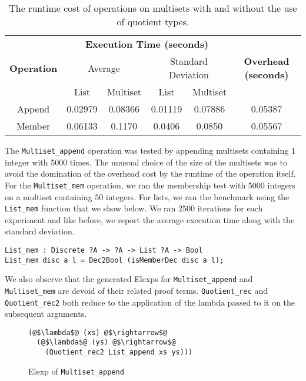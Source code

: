 \documentclass[12pt,twoside,maitrise]{dms}
\theoremstyle{definition}
\numberwithin{equation}{section}
\numberwithin{table}{chapter}
\numberwithin{figure}{chapter}
\newcommand\id[1] {\texttt{#1}}
\begin{document}
\begin{table}[]
\centering
\begin{tabular}{@{}cccccc@{}}
\toprule
\multirow{3}{*}{\textbf{Operation}} & \multicolumn{4}{c}{\textbf{Execution Time (seconds)}} & \multirow{3}{*}{\textbf{Overhead (seconds)}} \\ \cmidrule(lr){2-5}
       & \multicolumn{2}{c}{Average} & \multicolumn{2}{c}{Standard Deviation} &         \\ \cmidrule(lr){2-5}
       & List         & Multiset     & List              & Multiset           &         \\ \midrule
Append & 0.02979      & 0.08366      & 0.01119           & 0.07886            & 0.05387 \\
Member & 0.06133      & 0.1170       & 0.0406            & 0.0850             & 0.05567 \\ \bottomrule
\end{tabular}
\caption{The runtime cost of operations on multisets with and without the use of quotient types.}\label{tab:benchmark-multiset}
\end{table}

The \id{Multiset\_append} operation was tested by appending multisets containing
1 integer with 5000 times. The unusual choice of the size of the multisets was
to avoid the domination of the overhead cost by the runtime of the operation
itself. For the \id{Multiset\_mem} operation, we ran the membership test with
5000 integers on a multiset containing 50 integers. For lists, we ran the
benchmark using the \id{List\_mem} function that we show below. We ran 2500
iterations for each experiment and like before, we report the average execution
time along with the standard deviation.

\begin{verbatim}
List_mem : Discrete ?A -> ?A -> List ?A -> Bool
List_mem disc a l = Dec2Bool (isMemberDec disc a l);
\end{verbatim}

We also observe that the generated Elexps for \id{Multiset\_append} and
\id{Multiset\_mem} are devoid of their related proof terms. \id{Quotient\_rec}
and \id{Quotient\_rec2} both reduce to the application of the lambda passed to
it on the subsequent arguments.

\begin{figure}
\begin{verbatim}
(@$\lambda$@ (xs) @$\rightarrow$@
  (@$\lambda$@ (ys) @$\rightarrow$@
    (Quotient_rec2 List_append xs ys)))
\end{verbatim}
\caption{Elexp of \id{Multiset\_append}}
\end{figure}
\end{document}

